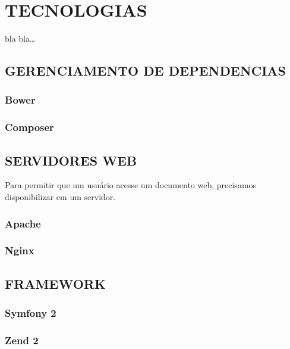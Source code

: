 \chapter{TECNOLOGIAS}
\label{tecnologias}

bla bla\ldots








\section{GERENCIAMENTO DE DEPENDENCIAS}
\subsection{Bower}
\subsection{Composer}

\section{SERVIDORES WEB}
Para permitir que um usuário acesse um documento web, precisamos disponibilizar
em um servidor. %

\subsection{Apache}
\subsection{Nginx}

\section{FRAMEWORK}
\subsection{Symfony 2}
\subsection{Zend 2}

